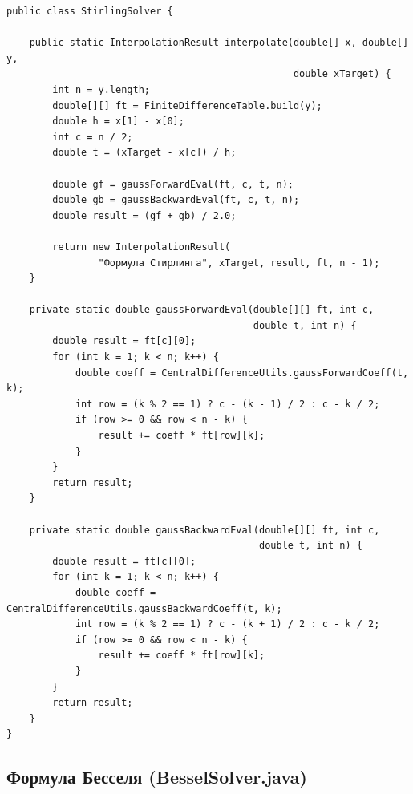 \begin{lstlisting}[style=javaStyle, label=code:stirling]
public class StirlingSolver {

    public static InterpolationResult interpolate(double[] x, double[] y,
                                                  double xTarget) {
        int n = y.length;
        double[][] ft = FiniteDifferenceTable.build(y);
        double h = x[1] - x[0];
        int c = n / 2;
        double t = (xTarget - x[c]) / h;

        double gf = gaussForwardEval(ft, c, t, n);
        double gb = gaussBackwardEval(ft, c, t, n);
        double result = (gf + gb) / 2.0;

        return new InterpolationResult(
                "Формула Стирлинга", xTarget, result, ft, n - 1);
    }

    private static double gaussForwardEval(double[][] ft, int c,
                                           double t, int n) {
        double result = ft[c][0];
        for (int k = 1; k < n; k++) {
            double coeff = CentralDifferenceUtils.gaussForwardCoeff(t, k);
            int row = (k % 2 == 1) ? c - (k - 1) / 2 : c - k / 2;
            if (row >= 0 && row < n - k) {
                result += coeff * ft[row][k];
            }
        }
        return result;
    }

    private static double gaussBackwardEval(double[][] ft, int c,
                                            double t, int n) {
        double result = ft[c][0];
        for (int k = 1; k < n; k++) {
            double coeff = CentralDifferenceUtils.gaussBackwardCoeff(t, k);
            int row = (k % 2 == 1) ? c - (k + 1) / 2 : c - k / 2;
            if (row >= 0 && row < n - k) {
                result += coeff * ft[row][k];
            }
        }
        return result;
    }
}
\end{lstlisting}

\subsection{Формула Бесселя (BesselSolver.java)}

